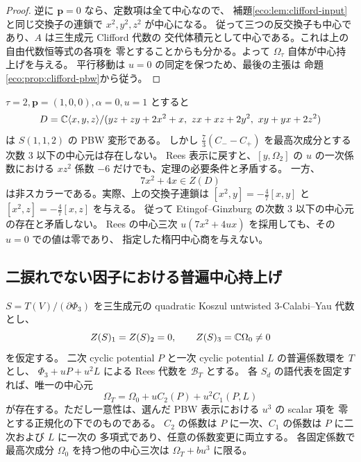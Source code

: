 \begin{proof}
逆に $\mathbf p=0$ なら、定数項は全て中心なので、
補題\ref{eco:lem:clifford-input}と同じ交換子の連鎖で
$x^2,y^2,z^2$ が中心になる。
従って三つの反交換子も中心であり、$A$ は三生成元 Clifford 代数の
交代体積元として中心である。これは上の自由代数恒等式の各項を
零とすることからも分かる。よって $\Omega_\tau$ 自体が中心持上げを与える。
平行移動は $u=0$ の同定を保つため、最後の主張は
命題\ref{eco:prop:clifford-pbw}から従う。
\end{proof}

\begin{example}
\label{eco:ex:rational-obstruction}
$\tau=2,\mathbf p=(1,0,0),\alpha=0,u=1$ とすると
\[
 D=\mathbb C\langle x,y,z\rangle/
 (yz+zy+2x^2+x,\ zx+xz+2y^2,\ xy+yx+2z^2)
\]
は $S(1,1,2)$ の PBW 変形である。
しかし $\frac73(C_--C_+)$ を最高次成分とする次数 $3$ 以下の中心元は存在しない。
Rees 表示に戻すと、$[y,\Omega_2]$ の $u$ の一次係数における
$xz^2$ 係数 $-6$ だけでも、定理の必要条件と矛盾する。
一方、
\[
                         7x^2+4x\in Z(D)
\]
は非スカラーである。実際、上の交換子連鎖は
$[x^2,y]=-\frac47[x,y]$ と $[x^2,z]=-\frac47[x,z]$ を与える。
従って Etingof--Ginzburg の次数 $3$ 以下の中心元の存在と矛盾しない。
Rees の中心三次 $u(7x^2+4ux)$ を採用しても、その $u=0$ での値は零であり、
指定した楕円中心商を与えない。
\end{example}

\subsection{二捩れでない因子における普遍中心持上げ}

\begin{proposition}[低次数中心がない場合の多項式持上げ]
\label{eco:prop:universal-lift}
$S=T(V)/(\partial\Phi_3)$ を三生成元の quadratic Koszul
untwisted $3$-Calabi--Yau 代数とし、
\[
 Z(S)_1=Z(S)_2=0,\qquad Z(S)_3=\mathbb C\Omega_0\ne0
\]
を仮定する。
二次 cyclic potential $P$ と一次 cyclic potential $L$ の普遍係数環を $T$ とし、
$\Phi_3+uP+u^2L$ による Rees 代数を $\mathcal B_T$ とする。
各 $S_d$ の語代表を固定すれば、唯一の中心元
\begin{equation}\label{eco:eq:universal-lift}
 \Omega_T=\Omega_0+uC_2(P)+u^2C_1(P,L)
\end{equation}
が存在する。ただし一意性は、選んだ PBW 表示における $u^3$ の scalar 項を
零とする正規化の下でのものである。
$C_2$ の係数は $P$ に一次、$C_1$ の係数は $P$ に二次および $L$ に一次の
多項式であり、任意の係数変更に両立する。
各固定係数で最高次成分 $\Omega_0$ を持つ他の中心三次は
$\Omega_T+bu^3$ に限る。
\end{proposition}

